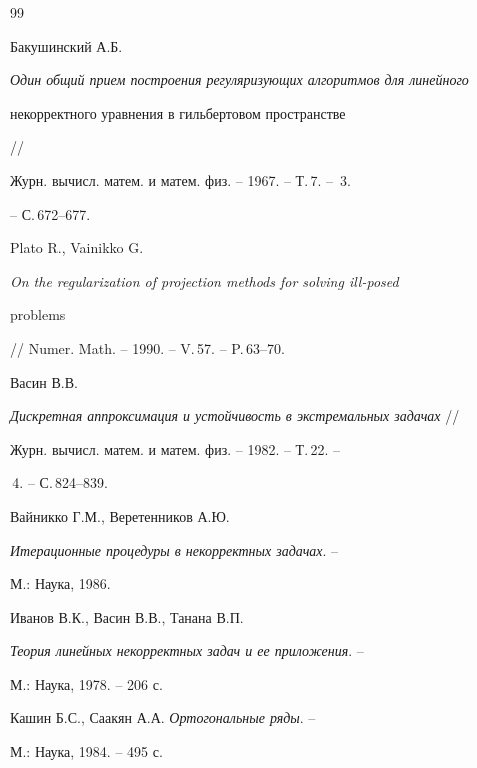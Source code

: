 \begin{thebibliography}{99}







Бакушинский А.Б.


{\em Один общий прием построения регуляризующих алгоритмов для линейного


некорректного уравнения в гильбертовом пространстве} //


Журн. вычисл. матем. и матем. физ. -- 1967. -- Т.\,7. -- \No\,3.


-- С.\,672--677.







Plato R., Vainikko G.


{\em On the regularization of projection methods for solving ill-posed


problems} // Numer. Math. -- 1990. -- V.\,57. -- P.\,63--70.







Васин В.В.


{\em Дискретная аппроксимация и устойчивость в экстремальных задачах} //


Журн. вычисл. матем. и матем. физ. -- 1982. -- Т.\,22. --


\No\,4. -- С.\,824--839.







Вайникко Г.М., Веретенников А.Ю.


{\em Итерационные процедуры в некорректных задачах}. --


М.: Наука, 1986.







Иванов В.К., Васин В.В., Танана В.П.


{\em Теория линейных некорректных задач и ее приложения}. --


М.: Наука, 1978. -- 206 с.







Кашин Б.С., Саакян А.А. {\em Ортогональные ряды}. --


М.: Наука, 1984. -- 495 с.






\end{thebibliography}
